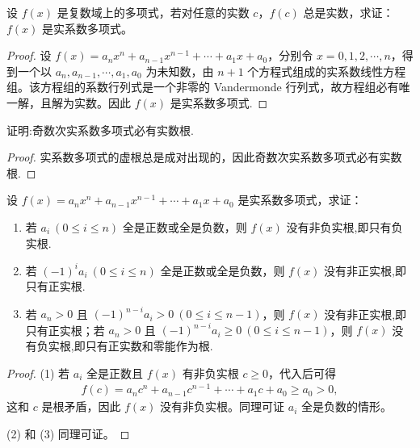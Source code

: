\documentclass[../../main.tex]{subfiles}
\begin{document}
\begin{proposition}\label{proposition:实系数多项式的判定条件}
设 $f(x)$ 是复数域上的多项式，若对任意的实数 $c$，$f(c)$ 总是实数，求证：$f(x)$ 是实系数多项式。
\end{proposition}
\begin{proof}
设 $f(x) = a_n x^n + a_{n-1} x^{n-1} + \cdots + a_1 x + a_0$，分别令 $x = 0, 1, 2, \cdots, n$，得到一个以 $a_n, a_{n-1}, \cdots, a_1, a_0$ 为未知数，由 $n + 1$ 个方程式组成的实系数线性方程组。该方程组的系数行列式是一个非零的 Vandermonde 行列式，故方程组必有唯一解，且解为实数。因此 $f(x)$ 是实系数多项式.

\end{proof}

\begin{example}
证明:奇数次实系数多项式必有实数根.
\end{example}
\begin{proof}
实系数多项式的虚根总是成对出现的，因此奇数次实系数多项式必有实数根.

\end{proof}

\begin{proposition}\label{proposition:实系数多项式的根的符号判定准则}
设 $f(x) = a_n x^n + a_{n-1} x^{n-1} + \cdots + a_1 x + a_0$ 是实系数多项式，求证：
\begin{enumerate}[(1)]
\item 若 $a_i \ (0 \leqslant  i \leqslant  n)$ 全是正数或全是负数，则 $f(x)$ 没有非负实根,即只有负实根.
\item 若 $(-1)^i a_i \ (0 \leqslant  i \leqslant  n)$ 全是正数或全是负数，则 $f(x)$ 没有非正实根,即只有正实根.
\item 若 $a_n > 0$ 且 $(-1)^{n-i} a_i > 0 \ (0 \leqslant  i \leqslant  n-1)$，则 $f(x)$ 没有非正实根,即只有正实根；若 $a_n > 0$ 且 $(-1)^{n-i} a_i \geqslant  0 \ (0 \leqslant  i \leqslant  n-1)$，则 $f(x)$ 没有负实根,即只有正实数和零能作为根.
\end{enumerate}
\end{proposition}
\begin{proof}
(1) 若 $a_i$ 全是正数且 $f(x)$ 有非负实根 $c \geqslant  0$，代入后可得
\begin{align*}
f(c) = a_n c^n + a_{n-1} c^{n-1} + \cdots + a_1 c + a_0 \geqslant  a_0 > 0,
\end{align*}
这和 $c$ 是根矛盾，因此 $f(x)$ 没有非负实根。同理可证 $a_i$ 全是负数的情形。

(2) 和 (3) 同理可证。

\end{proof}
\end{document}
